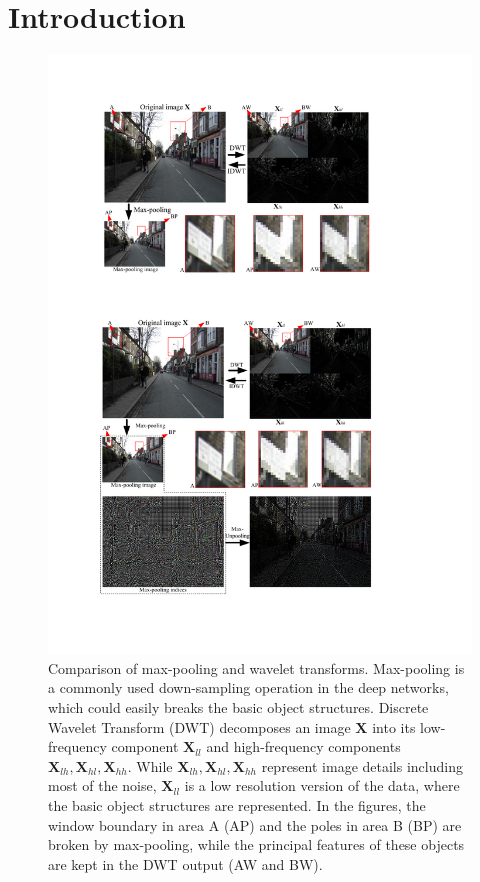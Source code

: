 \documentclass[10pt,twocolumn,letterpaper]{article}
\begin{document}
\section{Introduction}
\begin{figure}[!tbp]
	\centering
	\includegraphics*[scale=0.625, viewport=78 536 451 772]{figures/DWT-max_pooling.pdf}
	\caption{Comparison of max-pooling and wavelet transforms.
		Max-pooling is a commonly used down-sampling operation in the deep networks,
		which could easily breaks the basic object structures.
		Discrete Wavelet Transform (DWT) decomposes an image $\textbf{X}$ into its low-frequency component $\textbf{X}_{ll}$
		and high-frequency components $\textbf{X}_{lh}, \textbf{X}_{hl}, \textbf{X}_{hh}$.
		While $\textbf{X}_{lh}, \textbf{X}_{hl}, \textbf{X}_{hh}$ represent image details including most of the noise,
		$\textbf{X}_{ll}$ is a low resolution version of the data, where the basic object structures are represented.
		In the figures, the window boundary in area A (AP) and the poles in area B (BP) are broken by max-pooling,
		while the principal features of these objects are kept in the DWT output (AW and BW).
	}\label{fig_DWT}
\end{figure}
\end{document}

